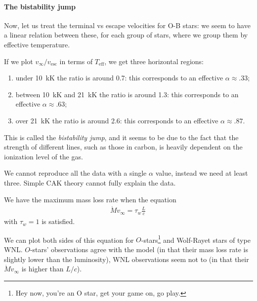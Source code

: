 \documentclass[main.tex]{subfiles}
\begin{document}

\paragraph{The bistability jump}

Now, let us treat the terminal vs escape velocities for O-B stars: we seem to have a linear relation between these,  for each group of stars, where we group them by effective temperature. 

If we plot \(v_{ \infty }/ v _{\text{esc}}\) in terms of \(T _{\text{eff}}\), we get three horizontal regions: 
\begin{enumerate}
  \item under \SI{10}{\kilo\kelvin} the ratio is around \num{.7}: this corresponds to an effective \(\alpha \approx \num{.33}\);
  \item between \SI{10}{\kilo\kelvin} and \SI{21}{\kilo\kelvin} the ratio is around \num{1.3}: this corresponds to an effective \(\alpha \approx \num{.63}\);
  \item over \SI{21}{\kilo\kelvin} the ratio is around \num{2.6}: this corresponds to an effective \(\alpha \approx
  \num{.87}\). 
\end{enumerate}

This is called the \emph{bistability jump}, and it seems to be due to the fact that the strength of different lines, such as those in carbon, is heavily dependent on the ionization level of the gas.

We cannot reproduce all the data with a single \(\alpha \) value, instead we need at least three. Simple CAK theory cannot fully explain the data.

We have the maximum mass loss rate when the equation 
%
\begin{align}
  \dot{M} v_{ \infty } = \tau_{w} \frac{L}{c}   
\,
\end{align}
%
with \(\tau_{w} = 1\) is satisfied. 

We can plot both sides of this equation for \(O\)-stars\footnote{Hey now, you're an O star, get your game on, go play.} and Wolf-Rayet stars of type WNL.
\(O\)-stars' observations agree with the model (in that their mass loss rate is slightly lower than the luminosity), WNL observations seem not to (in that their \(\dot{M} v_{ \infty }\) is higher than \(L/c\)). 
\end{document}
